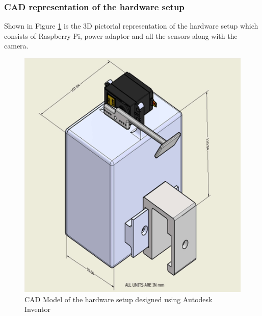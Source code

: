 \documentclass[conference]{IEEEtran}
\begin{document}
\subsubsection{CAD representation of the hardware setup}
Shown in Figure \ref{fig:hardware} is the 3D pictorial representation of the hardware setup which consists of Raspberry Pi, power adaptor and all the sensors along with the camera.
\begin{figure}[htbp]
  \centering
  \includegraphics[scale=0.65]{./pic/hardware.png}
  \caption{CAD Model of the hardware setup designed using Autodesk Inventor}
  \label{fig:hardware}
\end{figure}
\end{document}
